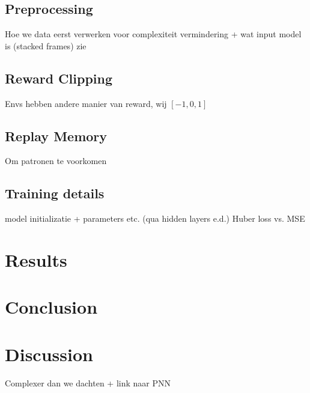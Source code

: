 \documentclass{article}
\begin{document}
\subsection{Preprocessing}
Hoe we data eerst verwerken voor complexiteit vermindering + wat input model is (stacked frames) zie \cite{mnih2013playing}

\subsection{Reward Clipping}
Envs hebben andere manier van reward, wij $[-1, 0, 1]$

\subsection{Replay Memory}
Om patronen te voorkomen \cite{mnih2013playing}

\subsection{Training details}
model initializatie + parameters etc. (qua hidden layers e.d.)
Huber loss vs. MSE


\section{Results}


\section{Conclusion}


\section{Discussion}
Complexer dan we dachten + link naar PNN

\cite{*}


\end{document}
